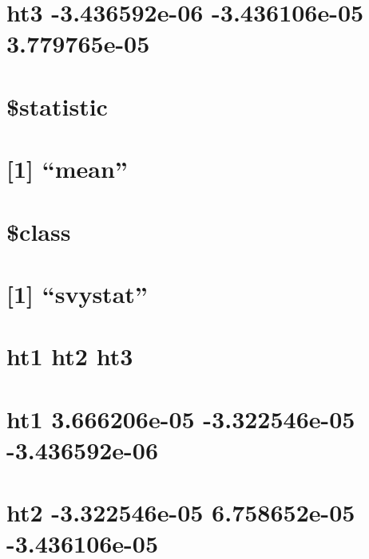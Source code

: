 \documentclass[]{book}
\theoremstyle{definition}
\theoremstyle{definition}
\theoremstyle{definition}
\theoremstyle{remark}
\begin{document}
\section{ht3 -3.436592e-06 -3.436106e-05
3.779765e-05}\label{ht3--3.436592e-06--3.436106e-05-3.779765e-05}

\section{}\label{section-75}

\section{\$statistic}\label{statistic}

\section{\texorpdfstring{{[}1{]} ``mean''}{{[}1{]} mean}}\label{mean}

\section{}\label{section-76}

\section{\$class}\label{class}

\section{\texorpdfstring{{[}1{]}
``svystat''}{{[}1{]} svystat}}\label{svystat}

\section{ht1 ht2 ht3}\label{ht1-ht2-ht3-3}

\section{ht1 3.666206e-05 -3.322546e-05
-3.436592e-06}\label{ht1-3.666206e-05--3.322546e-05--3.436592e-06-1}

\section{ht2 -3.322546e-05 6.758652e-05
-3.436106e-05}\label{ht2--3.322546e-05-6.758652e-05--3.436106e-05-1}
\end{document}
